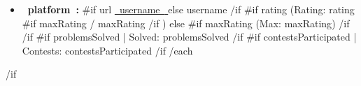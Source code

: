 \documentclass[10pt,a4paper]{article}
\begin{document}
\begin{itemize}
    {{#each codingProfiles}}
    \item
    \textbf{ {{~platform~}}: }
    {{#if url}}
    \href{ {{~url~}} }{ {{~username~}} }
    {{else}}
    {{username}}
    {{/if}}
    {{#if rating}}
    \enspace (Rating: {{rating}}
    {{#if maxRating}}
    / {{maxRating}}
    {{/if}}
    )
    {{else}}
    {{#if maxRating}}
    \enspace (Max: {{maxRating}})
    {{/if}}
    {{/if}}
    {{#if problemsSolved}}
    \enspace | \enspace Solved: {{problemsSolved}}
    {{/if}}
    {{#if contestsParticipated}}
    \enspace | \enspace Contests: {{contestsParticipated}}
    {{/if}}
    {{/each}}
\end{itemize}

{{/if}}
\end{document}
